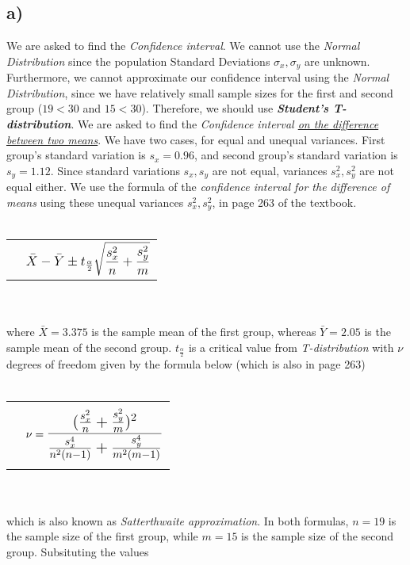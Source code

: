 \documentclass[12pt]{article}
\begin{document}
\subsection*{a)}
We are asked to find the \textit{Confidence interval}. We cannot
use the \textit{Normal Distribution} since the population Standard Deviations 
$\sigma_x, \sigma_y$ are unknown. Furthermore, we cannot approximate our confidence interval using 
the \textit{Normal Distribution}, since we have \hypertarget{small}{relatively small} sample sizes 
for the first and second group ($19<30$ and $15<30$). 
Therefore, we should use \textit{\textbf{Student’s T-distribution}}.
We are asked to find the \textit{Confidence interval \underline{on the difference between two means}}.
We have two cases, for equal and unequal variances. First group's
standard variation is $s_x=0.96$, and second group's standard variation is
$s_y=1.12$. Since standard variations $s_x, s_y$ are not equal, 
variances $s_x^2, s_y^2$ are not equal either. We use the formula of the
\textit{\hypertarget{confdiff}{confidence interval} for the difference of means} using these unequal
variances $s_x^2, s_y^2$, in page 263 of the textbook.
\\ \\
\begin{tabular}{l l}
    &$\bilargeMathText{\bar{X}-\bar{Y} \pm t_{\frac{\alpha}{2}}\sqrt{\frac{s_x^2}{n}+\frac{s_y^2}{m}}}$\\
\end{tabular}
\\ \\
where $\bar{X}=3.375$ is the sample mean of the first group, whereas
$\bar{Y}=2.05$ is the sample mean of the second group.
$t_{\frac{\alpha}{2}}$ is a critical value from
\textit{T-distribution} with $\nu$ degrees of freedom
given by the formula below (which is also in page 263)
\\ \\
\begin{tabular}{l l}
    &\\
    &$\nu=\trilargeMathText{\frac{(\frac{s_x^2}{n}+\frac{s_y^2}{m})^2}{\frac{s_x^4}{n^2(n-1)}+\frac{s_y^4}{m^2(m-1)}}}$\\
    &\\
\end{tabular}
\\ \\
which is also known as \hypertarget{satapp}{\textit{Satterthwaite approximation}}.
In both formulas, $n=19$ is the sample size of the first group, while
$m=15$ is the sample size of the second group. Subsituting the values 
\end{document}
